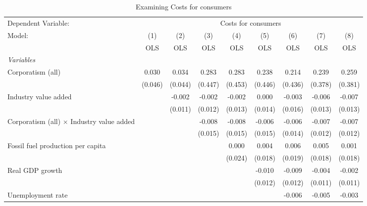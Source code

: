 
\begin{table}[htbp]
   \caption{Examining Costs for consumers}
   \centering
   \begin{tabular}{lcccccccc}
      \toprule
      Dependent Variable: & \multicolumn{8}{c}{Costs for consumers}\\
      Model:                                           & (1)     & (2)     & (3)     & (4)     & (5)     & (6)     & (7)     & (8)\\  
                                                       &  OLS    & OLS     & OLS     & OLS     & OLS     & OLS     & OLS     & OLS\\  
      \midrule
      \emph{Variables}\\
      Corporatism (all)                                & 0.030   & 0.034   & 0.283   & 0.283   & 0.238   & 0.214   & 0.239   & 0.259\\   
                                                       & (0.046) & (0.044) & (0.447) & (0.453) & (0.446) & (0.436) & (0.378) & (0.381)\\   
      Industry value added                             &         & -0.002  & -0.002  & -0.002  & 0.000   & -0.003  & -0.006  & -0.007\\   
                                                       &         & (0.011) & (0.012) & (0.013) & (0.014) & (0.016) & (0.013) & (0.013)\\   
      Corporatism (all) $\times$ Industry value added  &         &         & -0.008  & -0.008  & -0.006  & -0.006  & -0.007  & -0.007\\   
                                                       &         &         & (0.015) & (0.015) & (0.015) & (0.014) & (0.012) & (0.012)\\   
      Fossil fuel production per capita                &         &         &         & 0.000   & 0.004   & 0.006   & 0.005   & 0.001\\   
                                                       &         &         &         & (0.024) & (0.018) & (0.019) & (0.018) & (0.018)\\   
      Real GDP growth                                  &         &         &         &         & -0.010  & -0.009  & -0.004  & -0.002\\   
                                                       &         &         &         &         & (0.012) & (0.012) & (0.011) & (0.011)\\   
      Unemployment rate                                &         &         &         &         &         & -0.006  & -0.005  & -0.003\\   

\end{tabular}
\end{table}
